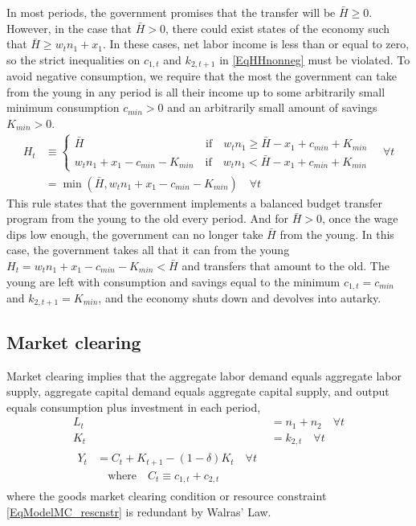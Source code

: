 \documentclass[letterpaper,12pt]{article}
\theoremstyle{definition}
\begin{document}
\begin{spacing}{1.5}
    In most periods, the government promises that the transfer will be $\bar{H}\geq 0$. However, in the case that $\bar{H}>0$, there could exist states of the economy such that $\bar{H}\geq w_t n_1 + x_1$. In these cases, net labor income is less than or equal to zero, so the strict inequalities on $c_{1,t}$ and $k_{2,t+1}$ in \eqref{EqHHnonneg} must be violated. To avoid negative consumption, we require that the most the government can take from the young in any period is all their income up to some arbitrarily small minimum consumption $c_{min}>0$ and an arbitrarily small amount of savings $K_{min}>0$.
    \begin{equation}\label{EqGovt_Ht}
      \begin{split}
        H_t &\equiv
          \begin{cases}
            \bar{H} \qquad\qquad\qquad\qquad\qquad\:\:\:\,\text{if}\quad w_t n_1 \geq \bar{H} - x_1 + c_{min} + K_{min} \\
            w_t n_1 + x_1 - c_{min} - K_{min} \quad\text{if}\quad w_t n_1 < \bar{H} - x_1 + c_{min} + K_{min}
          \end{cases} \quad\forall t \\
          &= \min\left(\bar{H}, w_t n_1 + x_1 - c_{min} - K_{min}\right) \quad\forall t
      \end{split}
    \end{equation}
    This rule states that the government implements a balanced budget transfer program from the young to the old every period. And for $\bar{H}>0$, once the wage dips low enough, the government can no longer take $\bar{H}$ from the young. In this case, the government takes all that it can from the young $H_t = w_t n_1 + x_1 - c_{min} - K_{min}<\bar{H}$ and transfers that amount to the old. The young are left with consumption and savings equal to the minimum $c_{1,t}=c_{min}$ and $k_{2,t+1}=K_{min}$, and the economy shuts down and devolves into autarky.


  \subsection{Market clearing}\label{SecModelShutMktClr}

    Market clearing implies that the aggregate labor demand equals aggregate labor supply, aggregate capital demand equals aggregate capital supply, and output equals consumption plus investment in each period,
    \begin{align}
      L_t &= n_1 + n_2 \quad\forall t \label{EqModelMC_L} \\
      K_t &= k_{2,t} \quad\forall t \label{EqModelMC_K} \\
      \begin{split}
        Y_t &= C_t + K_{t+1} - (1-\delta)K_t \quad\forall t \\
        &\quad\text{where}\quad C_t\equiv c_{1,t} + c_{2,t}
      \end{split} \label{EqModelMC_rescnstr}
    \end{align}
    where the goods market clearing condition or resource constraint \eqref{EqModelMC_rescnstr} is redundant by Walras' Law.



\end{spacing}
\end{document}
